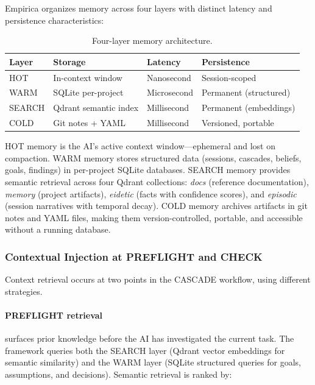 Empirica organizes memory across four layers with distinct latency and persistence characteristics:

\begin{table}[h]
\centering
\begin{tabular}{llll}
\toprule
\textbf{Layer} & \textbf{Storage} & \textbf{Latency} & \textbf{Persistence} \\
\midrule
HOT & In-context window & Nanosecond & Session-scoped \\
WARM & SQLite per-project & Microsecond & Permanent (structured) \\
SEARCH & Qdrant semantic index & Millisecond & Permanent (embeddings) \\
COLD & Git notes + YAML & Millisecond & Versioned, portable \\
\bottomrule
\end{tabular}
\caption{Four-layer memory architecture.}
\label{tab:memory-layers}
\end{table}

HOT memory is the AI's active context window---ephemeral and lost on compaction. WARM memory stores structured data (sessions, cascades, beliefs, goals, findings) in per-project SQLite databases. SEARCH memory provides semantic retrieval across four Qdrant collections: \emph{docs} (reference documentation), \emph{memory} (project artifacts), \emph{eidetic} (facts with confidence scores), and \emph{episodic} (session narratives with temporal decay). COLD memory archives artifacts in git notes and YAML files, making them version-controlled, portable, and accessible without a running database.

\subsubsection{Contextual Injection at PREFLIGHT and CHECK}

Context retrieval occurs at two points in the CASCADE workflow, using different strategies.

\paragraph{PREFLIGHT retrieval} surfaces prior knowledge before the AI has investigated the current task. The framework queries both the SEARCH layer (Qdrant vector embeddings for semantic similarity) and the WARM layer (SQLite structured queries for goals, assumptions, and decisions). Semantic retrieval is ranked by:

